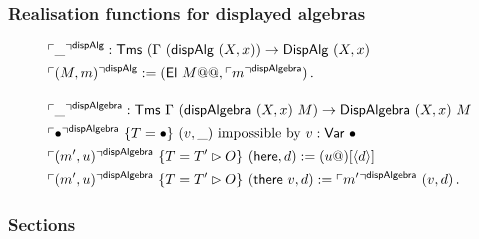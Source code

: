 \subsubsection{Realisation functions for displayed algebras}

\begin{fleqn}
\begin{align*}
&\emb{\_}^{\mta{dispAlg}} : \Tms\ (\Gamma \ (\mta{dispAlg}\ (X, x)) \to \mta{DispAlg}\ (X, x) \\
&\emb{(M, m)}^{\mta{dispAlg}} := (\mta{El}\ M@@, \emb{m}^{\mta{dispAlgebra}}) \,. \\[1em]
&\emb{\_}^{\mta{dispAlgebra}} : \Tms\ \Gamma \ (\mta{dispAlgebra}\ (X, x)\ M) \to \mta{DispAlgebra}\ (X, x)\ M \\
&\emb{\bullet}^{\mta{dispAlgebra}}\ \{T = \bullet\}\ (v, \_)\text{ impossible by $v : \mta{Var}\ \bullet$} \\
&\emb{(m', u)}^{\mta{dispAlgebra}}\ \{T = T' \rhd O\}\ (\mta{here}, d) := (u@)[\Msub{d}] \\
&\emb{(m', u)}^{\mta{dispAlgebra}}\ \{T = T' \rhd O\}\ (\mta{there}\ v, d) := \emb{m'}^{\mta{dispAlgebra}}\ (v, d) \,.
\end{align*}
\end{fleqn}

\subsubsection{Sections}

